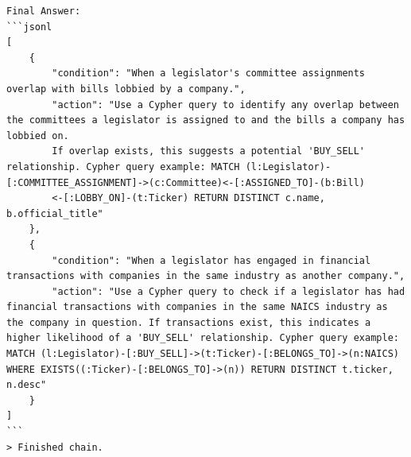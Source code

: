 \documentclass[15pt,letterpaper]{article}
\begin{document}
\begin{Verbatim}[breaklines=true, frame=single]
Final Answer:
```jsonl
[
    {
        "condition": "When a legislator's committee assignments overlap with bills lobbied by a company.",
        "action": "Use a Cypher query to identify any overlap between the committees a legislator is assigned to and the bills a company has lobbied on. 
        If overlap exists, this suggests a potential 'BUY_SELL' relationship. Cypher query example: MATCH (l:Legislator)-[:COMMITTEE_ASSIGNMENT]->(c:Committee)<-[:ASSIGNED_TO]-(b:Bill)
        <-[:LOBBY_ON]-(t:Ticker) RETURN DISTINCT c.name, b.official_title"
    },
    {
        "condition": "When a legislator has engaged in financial transactions with companies in the same industry as another company.",
        "action": "Use a Cypher query to check if a legislator has had financial transactions with companies in the same NAICS industry as the company in question. If transactions exist, this indicates a higher likelihood of a 'BUY_SELL' relationship. Cypher query example: MATCH (l:Legislator)-[:BUY_SELL]->(t:Ticker)-[:BELONGS_TO]->(n:NAICS) WHERE EXISTS((:Ticker)-[:BELONGS_TO]->(n)) RETURN DISTINCT t.ticker, n.desc"
    }
]
```
> Finished chain.

\end{Verbatim}





\end{document}
